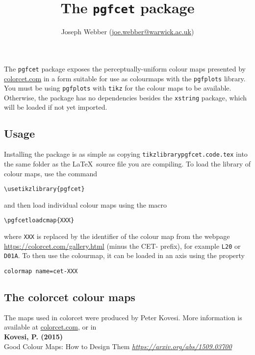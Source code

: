 \documentclass{article}
\begin{document}
    \title{The \texttt{pgfcet} package}
    \author{Joseph Webber (\href{mailto:joe.webber@warwick.ac.uk}{joe.webber@warwick.ac.uk})}
    \maketitle

    The \texttt{pgfcet} package exposes the perceptually-uniform colour maps presented by \href{https://colorcet.com}{colorcet.com} in a form suitable for use as colourmaps with the \texttt{pgfplots} library. You must be using \texttt{pgfplots} with \texttt{tikz} for the colour maps to be available. Otherwise, the package has no dependencies besides the \texttt{xstring} package, which will be loaded if not yet imported.

    \subsection*{Usage}
    Installing the package is as simple as copying \texttt{tikzlibrarypgfcet.code.tex} into the same folder as the \LaTeX\, source file you are compiling. To load the library of colour maps, use the command
    \begin{lstlisting}
\usetikzlibrary{pgfcet}
    \end{lstlisting}
    and then load individual colour maps using the macro
    \begin{lstlisting}
\pgfcetloadcmap{XXX}
    \end{lstlisting}
    where \texttt{XXX} is replaced by the identifier of the colour map from the webpage \href{https://colorcet.com/gallery.html}{https://colorcet.com/gallery.html} (minus the CET- prefix), for example \texttt{L20} or \texttt{D01A}. To then use the colourmap, it can be loaded in an axis using the property
    \begin{lstlisting}
colormap name=cet-XXX
    \end{lstlisting}

    \subsection*{The colorcet colour maps}
    The maps used in colorcet were produced by Peter Kovesi. More information is available at \href{https://colorcet.com}{colorcet.com}, or in\\

    {\color{gray}
    \noindent\textbf{Kovesi, P. (2015)}\\ Good Colour Maps: How to Design Them \textit{\href{arXiv:1509.03700 [cs.GR]}{https://arxiv.org/abs/1509.03700}}
    }
\end{document}
